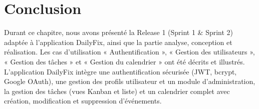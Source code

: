 \section{Conclusion}

Durant ce chapitre, nous avons présenté la Release 1 (Sprint 1 \& Sprint 2) adaptée à l'application DailyFix, ainsi que la partie analyse, conception et réalisation. Les cas d'utilisation « Authentification », « Gestion des utilisateurs », « Gestion des tâches » et « Gestion du calendrier » ont été décrits et illustrés. L'application DailyFix intègre une authentification sécurisée (JWT, bcrypt, Google OAuth), une gestion des profils utilisateur et un module d'administration, la gestion des tâches (vues Kanban et liste) et un calendrier complet avec création, modification et suppression d'événements.
